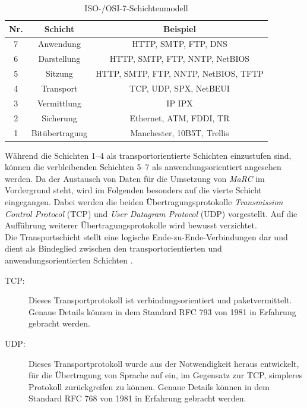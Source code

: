 \begin{table}
	\centering
	\renewcommand{\arraystretch}{1.4}
	\begin{tabular}{|c|c|c|}
		\hline
		\Absatzbox{}
		\textbf{Nr.} & \textbf{Schicht}&\textbf{Beispiel}\\
		\hline
		7 & Anwendung &  HTTP, SMTP, FTP, DNS\\
		\hline
		6 & Darstellung & HTTP, SMTP, FTP, NNTP, NetBIOS\\
		\hline
		5 & Sitzung& HTTP, SMTP, FTP, NNTP, NetBIOS, TFTP\\
		\hline
		4 & Transport & TCP, UDP, SPX, NetBEUI\\
		\hline
		3 & Vermittlung& IP IPX\\
		\hline
		2 & Sicherung & Ethernet, ATM, FDDI, TR\\
		\hline
		1 & Bitübertragung & Manchester, 10B5T, Trellis\\
		\hline
	\end{tabular}
	\caption{ISO-/OSI-7-Schichtenmodell}
	\label{tab:Schichtenmodell}
\end{table}

Während die Schichten 1--4 als transportorientierte Schichten einzustufen sind, können die verbleibenden Schichten 5--7 als anwendungsorientiert angesehen werden. Da der Austausch von Daten für die Umsetzung von \textit{MaRC} im Vordergrund steht, wird im Folgenden besonders auf die vierte Schicht eingegangen. Dabei werden die beiden Übertragungsprotokolle \textit{Transmission Control Protocol} (TCP) und \textit{User Datagram Protocol} (UDP) vorgestellt. Auf die Aufführung weiterer Übertragungsprotokolle wird bewusst verzichtet.\\
Die Transportschicht stellt eine logische Ende-zu-Ende-Verbindungen dar und dient als Bindeglied zwischen den transportorientierten und anwendungsorientierten Schichten \cite{ITU}.

\begin{description}
\item[TCP:] Dieses Transportprotokoll ist verbindungsorientiert und paketvermittelt. Genaue Details können in dem Standard RFC 793 \citep{rfc793} von 1981 in Erfahrung gebracht werden.

\item[UDP:] Dieses Transportprotokoll wurde aus der Notwendigkeit heraus entwickelt, für die Übertragung von Sprache auf ein, im Gegensatz zur TCP, simpleres Protokoll zurückgreifen zu können. Genaue Details können in dem Standard RFC 768 \citep{rfc768} von 1981 in Erfahrung gebracht werden.
\end{description}

